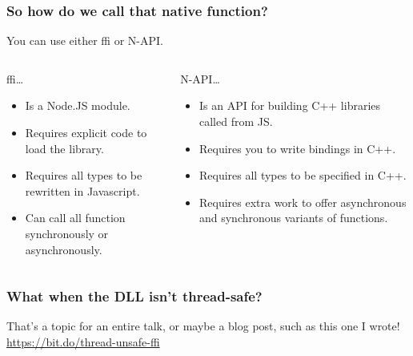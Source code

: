 \begin{frame}
	\frametitle{So how do we call that native function?}

	You can use either ffi or N-API. \vspace{1em}

	\begin{columns}[t]
		\begin{column}{0.5\textwidth}
			ffi…
			\begin{itemize}
				\item Is a Node.JS module.
				\item Requires explicit code to load the library.
				\item Requires all types to be rewritten in Javascript.
				\item Can call all function synchronously or asynchronously.
			\end{itemize}
		\end{column}
		\begin{column}{0.5\textwidth}
			N-API…
			\begin{itemize}
				\item Is an API for building C++ libraries called from JS.
				\item Requires you to write bindings in C++.
				\item Requires all types to be specified in C++.
				\item Requires extra work to offer asynchronous and synchronous
					variants of functions.
			\end{itemize}
		\end{column}
	\end{columns}
\end{frame}

\begin{frame}
	\frametitle{What when the DLL isn’t thread-safe?}

	\Large
	That’s a topic for an entire talk, or maybe a blog post, such as this one I wrote! \url{https://bit.do/thread-unsafe-ffi}
\end{frame}

